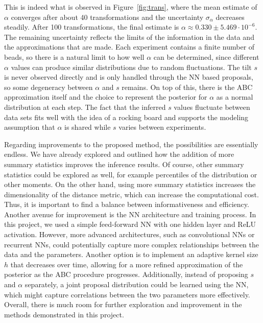 \documentclass[a4paper, 12pt]{article}
\begin{document}
This is indeed what is observed in Figure~\ref{fig:trans}, where the mean estimate of $\alpha$ converges after about 40 transformations and the uncertainty $\sigma_\alpha$ decreases steadily. After 100 transformations, the final estimate is $\alpha \approx 0.330 \pm 5.469 \cdot 10^{-6}$. The remaining uncertainty reflects the limits of the information in the data and the approximations that are made. Each experiment contains a finite number of beads, so there is a natural limit to how well $\alpha$ can be determined, since different $\alpha$ values can produce similar distributions due to random fluctuations. The tilt $s$ is never observed directly and is only handled through the NN based proposals, so some degeneracy between $\alpha$ and $s$ remains. On top of this, there is the ABC approximation itself and the choice to represent the posterior for $\alpha$ as a normal distribution at each step. The fact that the inferred $s$ values fluctuate between data sets fits well with the idea of a rocking board and supports the modeling assumption that $\alpha$ is shared while $s$ varies between experiments.

Regarding improvements to the proposed method, the possibilities are essentially endless. We have already explored and outlined how the addition of more summary statistics improves the inference results. Of course, other summary statistics could be explored as well, for example percentiles of the distribution or other moments. On the other hand, using more summary statistics increases the dimensionality of the distance metric, which can increase the computational cost. Thus, it is important to find a balance between informativeness and efficiency. Another avenue for improvement is the NN architecture and training process. In this project, we used a simple feed-forward NN with one hidden layer and ReLU activation. However, more advanced architectures, such as convolutional NNs or recurrent NNs, could potentially capture more complex relationships between the data and the parameters. Another option is to implement an adaptive kernel size $h$ that decreases over time, allowing for a more refined approximation of the posterior as the ABC procedure progresses. Additionally, instead of proposing $s$ and $\alpha$ separately, a joint proposal distribution could be learned using the NN, which might capture correlations between the two parameters more effectively. Overall, there is much room for further exploration and improvement in the methods demonstrated in this project.

\printbibliography
\end{document}
